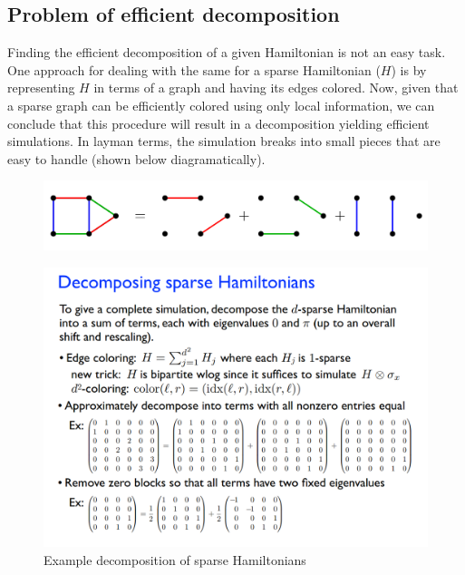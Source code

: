\documentclass[
10pt, %
a4paper, %
oneside, %
headinclude,footinclude, %
BCOR5mm, %
]{scrartcl}
\begin{document}
\subsection{Problem of efficient decomposition}
Finding the efficient decomposition of a given Hamiltonian is not an easy task. One approach for dealing with the same for a sparse Hamiltonian ($H$) is by representing $H$ in terms of a graph and having its edges colored. Now, given that a sparse graph can be efficiently colored using only local information, we can conclude that this procedure will result in a decomposition yielding efficient simulations. In layman terms, the simulation breaks into small pieces that are easy to handle (shown below diagramatically).
\begin{figure}[H]
    \centering
    \includegraphics[width=\linewidth]{images/sparse_graph.png}
\end{figure}

\begin{figure}[H]
    \centering
    \includegraphics[width=\linewidth]{decompose.png}
    \caption{Example decomposition of sparse Hamiltonians}
\end{figure}
\end{document}
